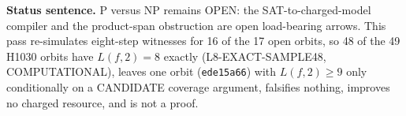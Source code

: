 \documentclass[11pt]{article}
\begin{document}
\bigskip
\noindent\textbf{Status sentence.} P versus NP remains OPEN: the SAT-to-charged-model compiler and the product-span obstruction are open load-bearing arrows. This pass re-simulates eight-step witnesses for 16 of the 17 open orbits, so 48 of the 49 H1030 orbits have $L(f,2)=8$ exactly (L8-EXACT-SAMPLE48, COMPUTATIONAL), leaves one orbit (\texttt{ede15a66}) with $L(f,2)\ge9$ only conditionally on a CANDIDATE coverage argument, falsifies nothing, improves no charged resource, and is not a proof.
\end{document}
